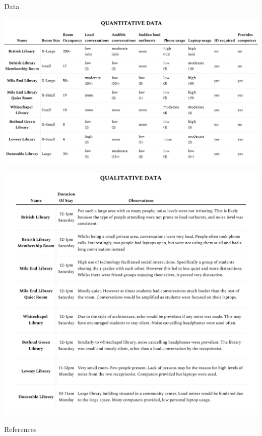 \documentclass{novel}
\begin{document}
\h{Data}
\begin{adjustwidth}{-2cm}{-2cm}
    \centering
\includegraphics[width=\dimexpr\paperwidth-4cm\relax]{resources/nData.pdf}
\end{adjustwidth}

\begin{adjustwidth}{-2cm}{-2cm}
    \centering
\includegraphics[width=\dimexpr\paperwidth-4cm\relax]{resources/lData.pdf}
\end{adjustwidth}

\h{References}
\end{document}
